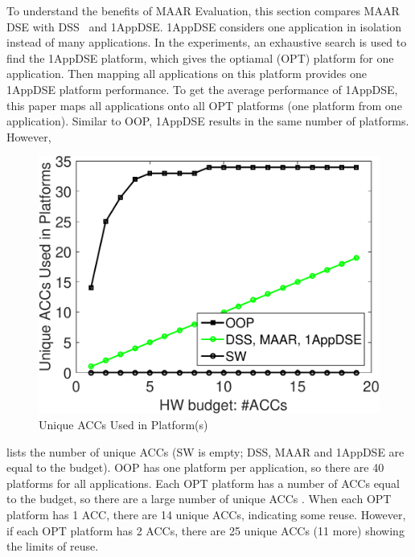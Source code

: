 To understand the benefits of MAAR Evaluation, this section compares MAAR DSE with DSS~\cite{zhang2018ds} and 1AppDSE.  1AppDSE considers one application in isolation instead of many applications. In the experiments, an exhaustive search is used to find the 1AppDSE platform, which gives the optiamal (OPT) platform for one application. Then mapping all applications on this platform provides one 1AppDSE platform performance. To get the average performance of 1AppDSE, this paper maps all applications onto all OPT platforms (one platform from one application). Similar to OOP, 1AppDSE results in the same number of platforms. However, 

\begingroup
\setlength{\columnsep}{8pt}%
\begin{figure}
	\begin{center}
		\includegraphics[width=\linewidth]{fig/oopHW.pdf}
	\end{center}
	\caption{Unique ACCs Used in Platform(s)}
	\label{fig:oopHW}
\end{figure}


 lists the number of unique ACCs 
(SW is empty; DSS, MAAR and 1AppDSE are equal to the budget). OOP has one platform per application, so there are 40 platforms for all applications. Each OPT platform has a number of ACCs equal to the budget, so there are a large number of unique ACCs . When each OPT platform has 1 ACC, there are 14 unique ACCs, indicating some reuse. However, if each OPT platform has 2 ACCs, there are 25 unique ACCs (11 more) showing the limits of reuse. 

\endgroup